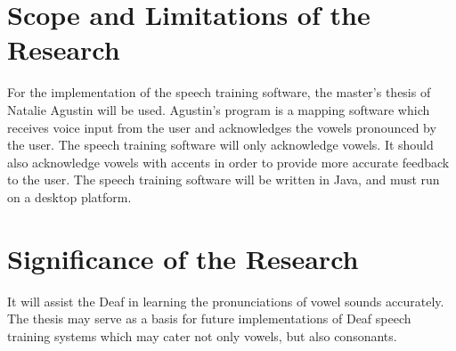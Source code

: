 \section{Scope and Limitations of the Research}
\label{sec:scopelimitations}

For the implementation of the speech training software, the master's thesis of Natalie Agustin \citeyear{agustin:2014:SOM} will be used. Agustin's program is a mapping software which receives voice input from the user and acknowledges the vowels pronounced by the user.
The speech training software will only acknowledge vowels. It should also acknowledge vowels with accents in order to provide more accurate feedback to the user.
The speech training software will be written in Java, and must run on a desktop platform.

\section{Significance of the Research}
\label{sec:significance}

It will assist the Deaf in learning the pronunciations of vowel sounds accurately.
The thesis may serve as a basis for future implementations of Deaf speech training systems which may cater not only vowels, but also consonants.